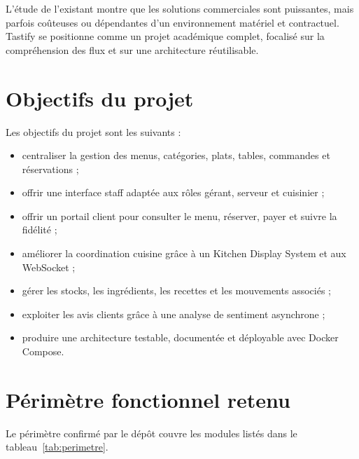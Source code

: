 L'étude de l'existant montre que les solutions commerciales sont puissantes, mais parfois coûteuses ou dépendantes d'un environnement matériel et contractuel. Tastify se positionne comme un projet académique complet, focalisé sur la compréhension des flux et sur une architecture réutilisable.

\section{Objectifs du projet}
Les objectifs du projet sont les suivants :

\begin{itemize}
  \item centraliser la gestion des menus, catégories, plats, tables, commandes et réservations ;
  \item offrir une interface staff adaptée aux rôles gérant, serveur et cuisinier ;
  \item offrir un portail client pour consulter le menu, réserver, payer et suivre la fidélité ;
  \item améliorer la coordination cuisine grâce à un Kitchen Display System et aux WebSocket ;
  \item gérer les stocks, les ingrédients, les recettes et les mouvements associés ;
  \item exploiter les avis clients grâce à une analyse de sentiment asynchrone ;
  \item produire une architecture testable, documentée et déployable avec Docker Compose.
\end{itemize}

\section{Périmètre fonctionnel retenu}
Le périmètre confirmé par le dépôt couvre les modules listés dans le tableau~\ref{tab:perimetre}.

